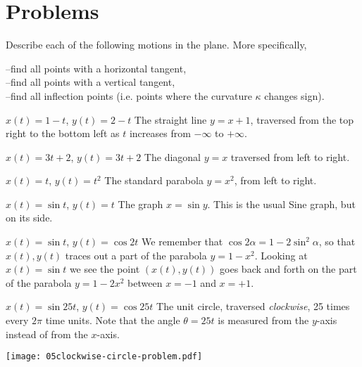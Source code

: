 \section{Problems} %
\problemfont %
\begin{multicols}{2}
\problem  Describe each of the following motions in the plane.  More %
specifically,  




\noindent
--find all points with a horizontal tangent,\\
--find all points with a vertical tangent,\\
--find all inflection points (i.e. points where the curvature $\kappa$ changes
sign).




\subprob \(x(t) =  1-t \), \(y(t) = 2- t  \)
\answer %
The straight line $y=x+1$, traversed from the top right to the bottom left
as $t$ increases from $-\infty$ to $+\infty$.
\endanswer




\subprob  \(x(t) =  3t+2 \), \(y(t) = 3t+2  \)
\answer %
The diagonal $y=x$ traversed from left to right.
\endanswer




\subprob  \(x(t) =  t \), \(y(t) = t^2  \)
\answer %
The standard parabola $y=x^2$, from left to right.
\endanswer




\subprob  \(x(t) =  \sin t \), \(y(t) = t  \)
\answer %
The graph $x=\sin y$.  This is the usual Sine graph, but on its side.




\centerline{ }
\endanswer




\subprob  \(x(t) =  \sin t \), \(y(t) = \cos 2t  \)
\answer %
We remember that $\cos2\alpha = 1-2\sin^2\alpha$, so that
$x(t), y(t)$ traces out a part of the parabola $y=1-x^2$.
Looking at $x(t) = \sin t$ we see the point $(x(t), y(t))$ goes back
and forth on the part of the parabola $y=1-2x^2$ between $x=-1$
and $x=+1$.
\endanswer




\subprob  \(x(t) =  \sin 25t \), \(y(t) = \cos 25t  \)
\answer %
The unit circle, traversed \emph{clockwise}, 25 times every $2\pi$ time units.
Note that the angle $\theta = 25t$ is measured from the $y$-axis instead of from
the $x$-axis.




\begin{center}
  \texttt{[image: 05clockwise-circle-problem.pdf]}
\end{center}
\endanswer





\end{multicols}

